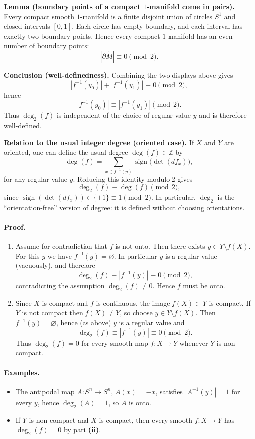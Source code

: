 \documentclass[12pt,a4paper]{article}
\theoremstyle{plain}
\theoremstyle{definition}      %
\begin{document}
\medskip
\noindent\textbf{Lemma (boundary points of a compact $1$-manifold come in pairs).}
Every compact smooth $1$-manifold is a finite disjoint union of circles $S^1$ and closed intervals $[0,1]$.
Each circle has empty boundary, and each interval has exactly two boundary points. Hence every compact $1$-manifold has an even number of boundary points:
\[
|\partial \widetilde M|\equiv 0 \pmod 2.
\]

\medskip
\noindent\textbf{Conclusion (well-definedness).}
Combining the two displays above gives
\[
|f^{-1}(y_0)|+|f^{-1}(y_1)|\equiv 0 \pmod 2,
\]
hence
\[
|f^{-1}(y_0)|\equiv |f^{-1}(y_1)|\pmod 2.
\]
Thus $\deg_2(f)$ is independent of the choice of regular value $y$ and is therefore well-defined.

\medskip
\noindent\textbf{Relation to the usual integer degree (oriented case).}
If $X$ and $Y$ are oriented, one can define the usual degree $\deg(f)\in\mathbb Z$ by
\[
\deg(f)=\sum_{x\in f^{-1}(y)} \operatorname{sign}\bigl(\det(df_x)\bigr),
\]
for any regular value $y$. Reducing this identity modulo $2$ gives
\[
\deg_2(f)\equiv \deg(f)\pmod 2,
\]
since $\operatorname{sign}(\det(df_x))\in\{\pm 1\}\equiv 1 \pmod 2$.
In particular, $\deg_2$ is the ``orientation-free'' version of degree: it is defined without choosing orientations.

\paragraph{Proof.}
\begin{enumerate}
	\item[\textbf{(i)}]
	Assume for contradiction that $f$ is not onto. Then there exists $y\in Y\setminus f(X)$. For this $y$ we have
	$f^{-1}(y)=\varnothing$. In particular $y$ is a regular value (vacuously), and therefore
	\[
	\deg_2(f)\equiv |f^{-1}(y)|\equiv 0 \pmod 2,
	\]
	contradicting the assumption $\deg_2(f)\neq 0$. Hence $f$ must be onto.
	
	\item[\textbf{(ii)}]
	Since $X$ is compact and $f$ is continuous, the image $f(X)\subset Y$ is compact. If $Y$ is not compact then
	$f(X)\neq Y$, so choose $y\in Y\setminus f(X)$. Then $f^{-1}(y)=\varnothing$, hence (as above) $y$ is a regular value and
	\[
	\deg_2(f)\equiv |f^{-1}(y)|\equiv 0 \pmod 2.
	\]
	Thus $\deg_2(f)=0$ for every smooth map $f:X\to Y$ whenever $Y$ is non-compact.
\end{enumerate}

\paragraph{Examples.}
\begin{itemize}
	\item The antipodal map $A:S^n\to S^n$, $A(x)=-x$, satisfies $|A^{-1}(y)|=1$ for every $y$, hence $\deg_2(A)=1$, so $A$ is onto.
	\item If $Y$ is non-compact and $X$ is compact, then every smooth $f:X\to Y$ has $\deg_2(f)=0$ by part \textbf{(ii)}.
\end{itemize}
\end{document}
